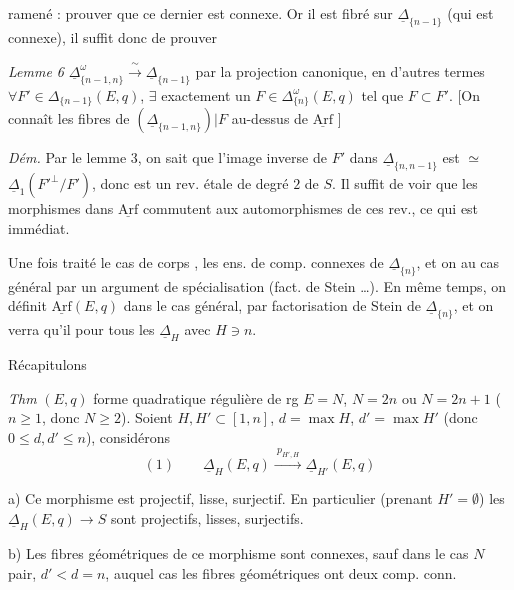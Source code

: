\documentclass[11pt,a4paper]{article}
\begin{document}
ramené : prouver que ce dernier est connexe. Or il est fibré sur
$\underline{\Delta}_{\{n-1\}}$ (qui est connexe), il suffit donc de prouver

\emph{Lemme 6} $\underline{\Delta}^{\omega}_{\{n-1,n\}} \xrightarrow{\ \sim\ } \underline{\Delta}_{\{n-1\}}$
par la projection canonique, en d'autres termes
$\forall F'\in\Delta_{\{n-1\}}(E,q)$, $\exists$ exactement un
$F\in\Delta^{\omega}_{\{n\}}(E,q)$ tel que $F\subset F'$.
[On connaît les fibres de $(\underline{\Delta}_{\{n-1,n\}})|F$ au-dessus de
$\underline{\mathrm{Arf}}$ \ill{} \ill{} ]

\emph{Dém.} Par le lemme 3, on sait que l'image inverse de $F'$ dans
$\underline{\Delta}_{\{n,n-1\}}$ est $\simeq$
$\underline{\Delta}_1(F'^{\perp}/F')$, donc est un rev. étale de degré $2$ de $S$.
Il suffit de voir que les morphismes  dans $\underline{\mathrm{Arf}}$
commutent aux automorphismes  de ces rev., ce qui est
immédiat.

Une fois traité le cas de corps , 
 les ens. de comp. connexes de $\underline{\Delta}_{\{n\}}$, et on
 au cas général par un argument de spécialisation (fact. de
Stein …). En même temps, on définit $\underline{\mathrm{Arf}}(E,q)$ dans le cas
général, par factorisation de Stein de $\underline{\Delta}_{\{n\}}$, et on verra qu'il
 pour tous les $\underline{\Delta}_H$ avec $H\ni n$.

Récapitulons

\emph{Thm} $(E,q)$ forme quadratique régulière de rg
$E=N$, $N=2n$ \struck{\ill{}} ou $N=2n+1$ ($n\geq 1$, donc $N\geq 2$).
Soient $H,H'\subset[1,n]$, $d=\max H$, $d'=\max H'$ (donc $0\le d,d'\le n$), considérons
\[
(1)\qquad \underline{\Delta}_H(E,q) \xrightarrow{\ p_{H',H}\ } \underline{\Delta}_{H'}(E,q)
\]

a) Ce morphisme est projectif,  lisse, surjectif.
En particulier (prenant $H'=\emptyset$) les $\underline{\Delta}_H(E,q)\to S$ sont
projectifs, lisses, surjectifs.

b) Les fibres géométriques de ce morphisme sont \struck{\ill{}} connexes, sauf dans le
cas $N$ pair, $d'<d=n$, auquel cas les fibres géométriques  ont deux
comp. conn.
\end{document}
